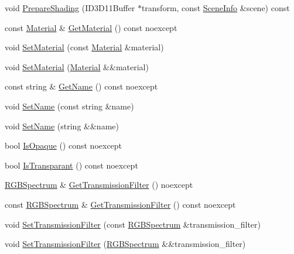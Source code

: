 \begin{DoxyCompactItemize}
\item 
void \hyperlink{structmage_1_1_shaded_material_ac72e210920e4ce6d84084106bb7d50c9}{Prepare\+Shading} (I\+D3\+D11\+Buffer $\ast$transform, const \hyperlink{structmage_1_1_scene_info}{Scene\+Info} \&scene) const
\item 
const \hyperlink{structmage_1_1_material}{Material} \& \hyperlink{structmage_1_1_shaded_material_a4de9a6fe5389da19cbe3e5b073622374}{Get\+Material} () const noexcept
\item 
void \hyperlink{structmage_1_1_shaded_material_aca5966123c3267d431539bea500d244b}{Set\+Material} (const \hyperlink{structmage_1_1_material}{Material} \&material)
\item 
void \hyperlink{structmage_1_1_shaded_material_a340a8eb8690a6ba809c33432607d02dd}{Set\+Material} (\hyperlink{structmage_1_1_material}{Material} \&\&material)
\item 
const string \& \hyperlink{structmage_1_1_shaded_material_af7be0282cc547159cd733475f63eb982}{Get\+Name} () const noexcept
\item 
void \hyperlink{structmage_1_1_shaded_material_a3f8d05c818362ef37bfcf9a02769d0ff}{Set\+Name} (const string \&name)
\item 
void \hyperlink{structmage_1_1_shaded_material_aa2a120f4df21d5fbde733ce12a348571}{Set\+Name} (string \&\&name)
\item 
bool \hyperlink{structmage_1_1_shaded_material_aa5bf63809d61d57587e2e3fd09dad45d}{Is\+Opaque} () const noexcept
\item 
bool \hyperlink{structmage_1_1_shaded_material_a2c45665faa666d3e85f51b13223e3699}{Is\+Transparant} () const noexcept
\item 
\hyperlink{structmage_1_1_r_g_b_spectrum}{R\+G\+B\+Spectrum} \& \hyperlink{structmage_1_1_shaded_material_a6f7957db6f13954152ffb9b71644fe80}{Get\+Transmission\+Filter} () noexcept
\item 
const \hyperlink{structmage_1_1_r_g_b_spectrum}{R\+G\+B\+Spectrum} \& \hyperlink{structmage_1_1_shaded_material_ac1735260a6d52bacbaea76594f7fbfdb}{Get\+Transmission\+Filter} () const noexcept
\item 
void \hyperlink{structmage_1_1_shaded_material_a8be0968eae5daf3d566ee063925671c6}{Set\+Transmission\+Filter} (const \hyperlink{structmage_1_1_r_g_b_spectrum}{R\+G\+B\+Spectrum} \&transmission\+\_\+filter)
\item 
void \hyperlink{structmage_1_1_shaded_material_a431b82b0149bda7229ba2d12123e4315}{Set\+Transmission\+Filter} (\hyperlink{structmage_1_1_r_g_b_spectrum}{R\+G\+B\+Spectrum} \&\&transmission\+\_\+filter)

\end{DoxyCompactItemize}
